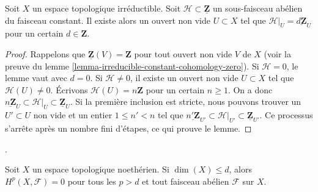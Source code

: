 \begin{lemma}

\label{lemma-subsheaf-irreducible}
Soit $X$ un espace topologique irréductible. Soit $\mathcal{H} \subset \underline{\mathbf{Z}}$ un sous-faisceau abélien du faisceau constant. Il existe alors un ouvert non vide $U \subset X$ tel que $\mathcal{H}|_U = \underline{d\mathbf{Z}}_U$ pour un certain $d \in \mathbf{Z}$.
\end{lemma}

\begin{proof}
Rappelons que $\underline{\mathbf{Z}}(V) = \mathbf{Z}$ pour tout ouvert non vide $V$ de $X$ (voir la preuve du lemme \ref{lemma-irreducible-constant-cohomology-zero}). Si $\mathcal{H} = 0$, le lemme vaut avec $d = 0$. Si $\mathcal{H} \not = 0$, il existe un ouvert non vide $U \subset X$ tel que $\mathcal{H}(U) \not = 0$. Écrivons $\mathcal{H}(U) = n\mathbf{Z}$ pour un certain $n \geq 1$. On a donc $\underline{n\mathbf{Z}}_U
\subset \mathcal{H}|_U \subset
\underline{\mathbf{Z}}_U$. Si la première inclusion est stricte, nous pouvons trouver un $U' \subset U$ non vide et un entier $1 \leq n' < n$ tel que $\underline{n'\mathbf{Z}}_{U'}
\subset \mathcal{H}|_{U'} \subset
\underline{\mathbf{Z}}_{U'}$. Ce processus s'arrête après un nombre fini d'étapes, ce qui prouve le lemme.
\end{proof}

\begin{proposition}
[Grothendieck]
\label{proposition-vanishing-Noetherian}

\begin{reference}
\cite[théorème 3.6.5]{Tohoku}.
\end{reference}
Soit $X$ un espace topologique noethérien. Si $\dim(X) \leq d$, alors $H^p(X, \mathcal{F}) = 0$ pour tous les $p > d$ et tout faisceau abélien $\mathcal{F}$ sur $X$.
\end{proposition}

